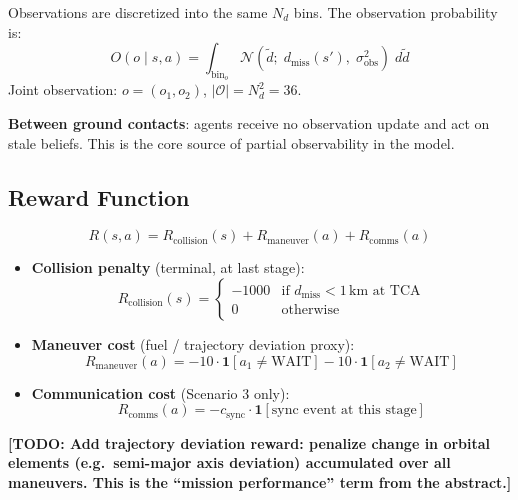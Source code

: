 \documentclass[11pt]{article}
\newcommand{\TODO}[1]{\textcolor{todo}{\textbf{[TODO: #1]}}}
\begin{document}
Observations are discretized into the same $N_d$ bins. The observation
probability is:
\begin{equation}
  O(o \mid s, a) = \int_{\text{bin}_o} \mathcal{N}(\tilde{d};\; d_\text{miss}(s'),\; \sigma_\text{obs}^2)\; d\tilde{d}
\end{equation}
Joint observation: $o = (o_1, o_2)$, $|\mathcal{O}| = N_d^2 = 36$.

\textbf{Between ground contacts}: agents receive no observation update and act
on stale beliefs. This is the core source of partial observability in the model.

\subsection{Reward Function}

\begin{equation}
  R(s, a) = R_\text{collision}(s) + R_\text{maneuver}(a) + R_\text{comms}(a)
\end{equation}

\begin{itemize}
  \item \textbf{Collision penalty} (terminal, at last stage):
    \begin{equation}
      R_\text{collision}(s) =
      \begin{cases}
        -1000 & \text{if } d_\text{miss} < 1\,\text{km at TCA} \\
        0 & \text{otherwise}
      \end{cases}
    \end{equation}
  \item \textbf{Maneuver cost} (fuel / trajectory deviation proxy):
    \begin{equation}
      R_\text{maneuver}(a) = -10 \cdot \mathbf{1}[a_1 \neq \text{WAIT}]
                             -10 \cdot \mathbf{1}[a_2 \neq \text{WAIT}]
    \end{equation}
  \item \textbf{Communication cost} (Scenario 3 only):
    \begin{equation}
      R_\text{comms}(a) = -c_\text{sync} \cdot \mathbf{1}[\text{sync event at this stage}]
    \end{equation}
\end{itemize}

\TODO{Add trajectory deviation reward: penalize change in orbital elements
(e.g.\ semi-major axis deviation) accumulated over all maneuvers. This is the
``mission performance'' term from the abstract.}
\end{document}

